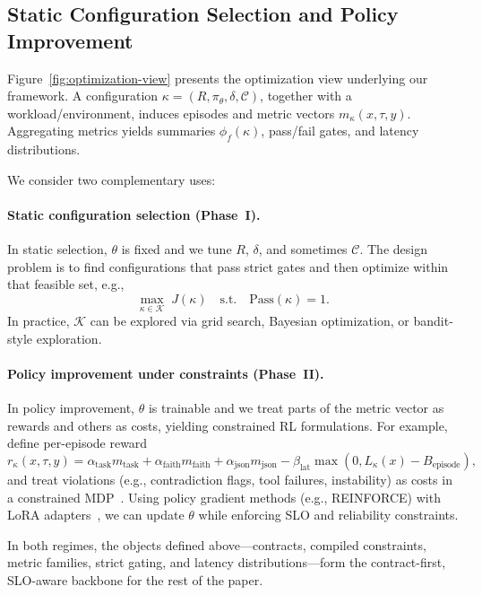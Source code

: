 \documentclass[11pt]{article}
\begin{document}
\subsection{Static Configuration Selection and Policy Improvement}
\label{sec:problem-optimization}

Figure~\ref{fig:optimization-view} presents the optimization view underlying our framework.
A configuration $\kappa=(R,\pi_\theta,\delta,\mathcal{C})$, together with a workload/environment, induces episodes and metric vectors $m_\kappa(x,\tau,y)$.
Aggregating metrics yields summaries $\phi_f(\kappa)$, pass/fail gates, and latency distributions.

We consider two complementary uses:

\paragraph{Static configuration selection (Phase~I).}
In static selection, $\theta$ is fixed and we tune $R$, $\delta$, and sometimes $\mathcal{C}$.
The design problem is to find configurations that pass strict gates and then optimize within that feasible set, e.g.,
\[
\max_{\kappa\in\mathcal{K}} \; J(\kappa)
\quad\text{s.t.}\quad \mathrm{Pass}(\kappa)=1.
\]
In practice, $\mathcal{K}$ can be explored via grid search, Bayesian optimization, or bandit-style exploration.

\paragraph{Policy improvement under constraints (Phase~II).}
In policy improvement, $\theta$ is trainable and we treat parts of the metric vector as rewards and others as costs, yielding constrained RL formulations.
For example, define per-episode reward
\[
r_\kappa(x,\tau,y)=
\alpha_{\text{task}} m_{\text{task}}+
\alpha_{\text{faith}} m_{\text{faith}}+
\alpha_{\text{json}} m_{\text{json}}
-\beta_{\text{lat}}\max(0, L_\kappa(x)-B_{\text{episode}}),
\]
and treat violations (e.g., contradiction flags, tool failures, instability) as costs in a constrained MDP~\citep{altman1999cmdp,achiam2017cpo}.
Using policy gradient methods (e.g., REINFORCE) with LoRA adapters~\citep{williams1992reinforce,dettmers2023qlora}, we can update $\theta$ while enforcing SLO and reliability constraints.

In both regimes, the objects defined above---contracts, compiled constraints, metric families, strict gating, and latency distributions---form the contract-first, SLO-aware backbone for the rest of the paper.
\end{document}
